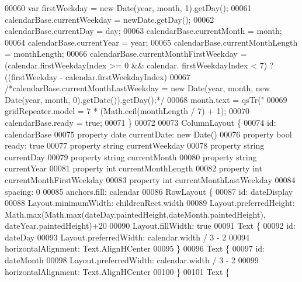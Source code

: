 \begin{DoxyCode}
{00060         var firstWeekday = \textcolor{keyword}{new} Date(year, month, 1).getDay();
00061         calendarBase.currentWeekday = newDate.getDay();
00062         calendarBase.currentDay = day;
00063         calendarBase.currentMonth = month;
00064         calendarBase.currentYear = year;
00065         calendarBase.currentMonthLength = monthLength;
00066         calendarBase.currentMonthFirstWeekday = (calendar.firstWeekdayIndex >= 0 && calendar.
      firstWeekdayIndex < 7) ? ((firstWeekday - calendar.firstWeekdayIndex) %
00067         \textcolor{comment}{/*calendarBase.currentMonthLastWeekday = new Date(year, month, new Date(year, month,
       0).getDate()).getDay();*/}
00068         month.text = qsTr(\textcolor{stringliteral}{"%
00069         gridRepeater.model = 7 * (Math.ceil(monthLength / 7) + 1);
00070         calendarBase.ready = \textcolor{keyword}{true};
00071     \}
00072 
00073     ColumnLayout \{
00074         \textcolor{keywordtype}{id}: calendarBase
00075         \textcolor{keyword}{property} date currentDate: \textcolor{keyword}{new} Date()
00076         property \textcolor{keywordtype}{bool} ready: true
00077         property \textcolor{keywordtype}{string} currentWeekday
00078         property \textcolor{keywordtype}{string} currentDay
00079         property \textcolor{keywordtype}{string} currentMonth
00080         property \textcolor{keywordtype}{string} currentYear
00081         property \textcolor{keywordtype}{int} currentMonthLength
00082         property \textcolor{keywordtype}{int} currentMonthFirstWeekday
00083         property \textcolor{keywordtype}{int} currentMonthLastWeekday
00084         spacing: 0
00085         anchors.fill: calendar
00086         RowLayout \{
00087             \textcolor{keywordtype}{id}: dateDisplay
00088             Layout.minimumWidth: childrenRect.width
00089             Layout.preferredHeight: Math.max(Math.max(dateDay.paintedHeight,dateMonth.paintedHeight),
      dateYear.paintedHeight)+20
00090             Layout.fillWidth: \textcolor{keyword}{true}
00091             Text \{
00092                 \textcolor{keywordtype}{id}: dateDay
00093                 Layout.preferredWidth: calendar.width / 3 - 2
00094                 horizontalAlignment: Text.AlignHCenter
00095             \}
00096             Text \{
00097                 \textcolor{keywordtype}{id}: dateMonth
00098                 Layout.preferredWidth: calendar.width / 3 - 2
00099                 horizontalAlignment: Text.AlignHCenter
00100             \}
00101             Text \{
}}
\end{DoxyCode}
